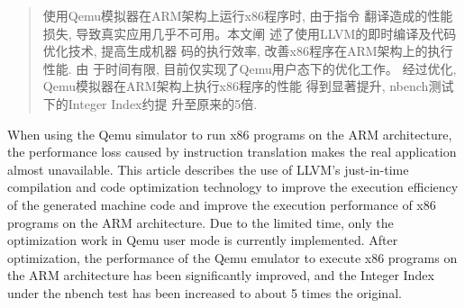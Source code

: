 

\begin{abstract}
  使用Qemu模拟器在ARM架构上运行x86程序时, 由于指令
  翻译造成的性能损失, 导致真实应用几乎不可用。本文阐
  述了使用LLVM的即时编译及代码优化技术, 提高生成机器
  码的执行效率, 改善x86程序在ARM架构上的执行性能. 由
  于时间有限, 目前仅实现了Qemu用户态下的优化工作。
  经过优化, Qemu模拟器在ARM架构上执行x86程序的性能
  得到显著提升, nbench测试下的Integer Index约提
  升至原来的5倍.

\end{abstract}

\begin{abstract*}
  When using the Qemu simulator to run x86 programs
   on the ARM architecture, the performance loss
   caused by instruction translation makes the
   real application almost unavailable. This article
    describes the use of LLVM's just-in-time compilation
     and code optimization technology to improve
     the execution efficiency of the generated
     machine code and improve the execution performance
      of x86 programs on the ARM architecture.
      Due to the limited time, only the optimization
       work in Qemu user mode is currently
    implemented. After optimization, the performance
     of the Qemu emulator to execute x86 programs
     on the ARM architecture has been significantly
     improved, and the Integer Index under the
    nbench test has been increased to about 5 times the original.
\end{abstract*}
